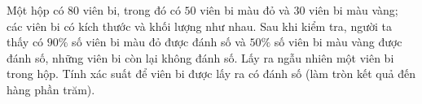 \begin{bt}%
	Một hộp có $80$ viên bi, trong đó có $50$ viên bi màu đỏ và $30$ viên bi màu vàng; các viên bi có kích  thước và khối lượng như nhau. Sau khi kiểm tra, người ta thấy có $90\%$ số viên bi màu đỏ được đánh số và $50\%$ số viên bi màu vàng được đánh số, những viên bi còn lại không đánh số. Lấy ra ngẫu nhiên một viên bi trong hộp. Tính xác suất để viên bi được lấy ra có đánh số (làm tròn kết quả đến hàng phần trăm).
\end{bt}


